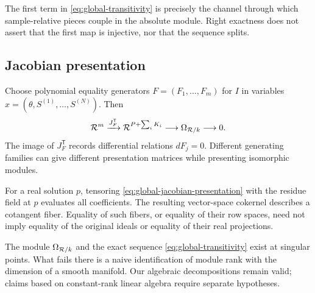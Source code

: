 The first term in \cref{eq:global-transitivity} is precisely the channel through
which sample-relative pieces couple in the absolute module.  Right exactness
does not assert that the first map is injective, nor that the sequence splits.

\subsection{Jacobian presentation}

Choose polynomial equality generators
\(F=(F_1,\ldots,F_m)\) for \(I\) in variables
\(x=(\theta,S^{(1)},\ldots,S^{(N)})\).  Then
\begin{equation}
  \mathcal{R}^m\xrightarrow{J_F^{\mathsf T}}\mathcal{R}^{P+\sum_iK_i}
  \longrightarrow\Omega_{\mathcal{R}/k}\longrightarrow0.
  \label{eq:global-jacobian-presentation}
\end{equation}
The image of \(J_F^{\mathsf T}\) records differential relations
\(dF_j=0\).  Different generating families can give different presentation
matrices while presenting isomorphic modules.

\begin{remark}
For a real solution \(p\), tensoring
\cref{eq:global-jacobian-presentation} with the residue field at \(p\) evaluates
all coefficients.  The resulting vector-space cokernel describes a cotangent
fiber.  Equality of such fibers, or equality of their row spaces, need not
imply equality of the original ideals or equality of their real projections.
\end{remark}

\begin{remark}
The module \(\Omega_{\mathcal{R}/k}\) and the exact sequence
\cref{eq:global-transitivity} exist at singular points.  What fails there is a
naive identification of module rank with the dimension of a smooth manifold.
Our algebraic decompositions remain valid; claims based on constant-rank
linear algebra require separate hypotheses.
\end{remark}
